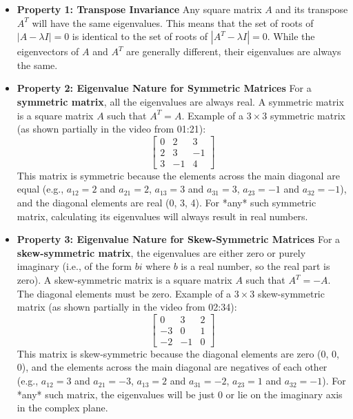 \documentclass{article}
\begin{document}
\begin{itemize}
    \item \textbf{Property 1: Transpose Invariance}
    Any square matrix $A$ and its transpose $A^T$ will have the same eigenvalues. This means that the set of roots of $|A - \lambda I| = 0$ is identical to the set of roots of $|A^T - \lambda I| = 0$. While the eigenvectors of $A$ and $A^T$ are generally different, their eigenvalues are always the same.

    \item \textbf{Property 2: Eigenvalue Nature for Symmetric Matrices}
    For a \textbf{symmetric matrix}, all the eigenvalues are always real. A symmetric matrix is a square matrix $A$ such that $A^T = A$.
    Example of a $3 \times 3$ symmetric matrix (as shown partially in the video from 01:21):
    \[ \begin{bmatrix} 0 & 2 & 3 \\ 2 & 3 & -1 \\ 3 & -1 & 4 \end{bmatrix} \]
    This matrix is symmetric because the elements across the main diagonal are equal (e.g., $a_{12}=2$ and $a_{21}=2$, $a_{13}=3$ and $a_{31}=3$, $a_{23}=-1$ and $a_{32}=-1$), and the diagonal elements are real (0, 3, 4). For *any* such symmetric matrix, calculating its eigenvalues will always result in real numbers.

    \item \textbf{Property 3: Eigenvalue Nature for Skew-Symmetric Matrices}
    For a \textbf{skew-symmetric matrix}, the eigenvalues are either zero or purely imaginary (i.e., of the form $bi$ where $b$ is a real number, so the real part is zero). A skew-symmetric matrix is a square matrix $A$ such that $A^T = -A$. The diagonal elements must be zero.
    Example of a $3 \times 3$ skew-symmetric matrix (as shown partially in the video from 02:34):
    \[ \begin{bmatrix} 0 & 3 & 2 \\ -3 & 0 & 1 \\ -2 & -1 & 0 \end{bmatrix} \]
    This matrix is skew-symmetric because the diagonal elements are zero (0, 0, 0), and the elements across the main diagonal are negatives of each other (e.g., $a_{12}=3$ and $a_{21}=-3$, $a_{13}=2$ and $a_{31}=-2$, $a_{23}=1$ and $a_{32}=-1$). For *any* such matrix, the eigenvalues will be just 0 or lie on the imaginary axis in the complex plane.


\end{itemize}
\end{document}
